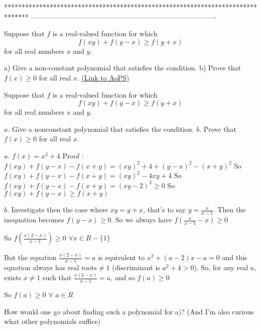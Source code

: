 *******************************************************************************
-------------------------------------------------------------------------------

\begin{problem}
	Suppose that $ f$ is a real-valued function for which \[ f(xy)+f(y-x)\geq f(y+x)\] for all real numbers $ x$ and $ y$. 
    
a) Give a non-constant polynomial that satisfies the condition.
b) Prove that $ f(x)\geq 0$ for all real $ x$.
	\flushright \href{https://artofproblemsolving.com/community/c6h160835}{(Link to AoPS)}
\end{problem}



\begin{mysolution}
	\begin{tcolorbox}Suppose that $ f$ is a real-valued function for which
\[ f(xy)+f(y-x)\geq f(y+x) \]
for all real numbers $ x$ and $ y$. 
    
$ a.$ Give a nonconstant polynomial that satisfies the condition.
$ b.$ Prove that $ f(x)\geq 0$ for all real $ x$.\end{tcolorbox}

$ a.$ $ f(x)=x^{2}+4$
Proof : $ f(xy)+f(y-x)-f(x+y)=(xy)^{2}+4+(y-x)^{2}-(x+y)^{2}$
So $ f(xy)+f(y-x)-f(x+y)=(xy)^{2}-4xy+4$
So $ f(xy)+f(y-x)-f(x+y)=(xy-2)^{2}\geq 0$
So $ f(xy)+f(y-x)\geq f(x+y)$

$ b.$ Investigate then the case where $ xy=y+x$, that's to say $ y=\frac{x}{x-1}$. Then the inequation becomes $ f(y-x)\geq 0$. So we always have $ f(\frac{x}{x-1}-x)\geq 0$

So $ f(\frac{x(2-x)}{x-1})\geq 0$ $ \forall x\in %
{R}-\{1\}$

But the equation $ \frac{x(2-x)}{x-1}=a$ is equivalent to $ x^{2}+(a-2)x-a=0$ and this equation always has real roots$ \neq 1$ (discriminant is $ a^{2}+4>0$).
So, for any real $ a$, exists $ x\neq 1$ such that $ \frac{x(2-x)}{x-1}=a$, and so $ f(a)\geq 0$

So $ f(a)\geq 0$ $ \forall$ $ a\in%
{R}$
\end{mysolution}



\begin{mysolution}
	How would one go about finding such a polynomial for a)? (And I'm also curious what other polynomials suffice)
\end{mysolution}



